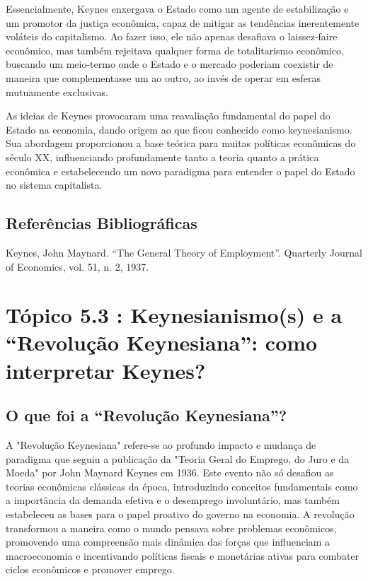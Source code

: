\documentclass[a4paper,12pt]{article}[abntex2]
\begin{document}
Essencialmente, Keynes enxergava o Estado como um agente de estabilização e um promotor da justiça econômica, capaz de mitigar as tendências inerentemente voláteis do capitalismo. Ao fazer isso, ele não apenas desafiava o laissez-faire econômico, mas também rejeitava qualquer forma de totalitarismo econômico, buscando um meio-termo onde o Estado e o mercado poderiam coexistir de maneira que complementasse um ao outro, ao invés de operar em esferas mutuamente exclusivas.

As ideias de Keynes provocaram uma reavaliação fundamental do papel do Estado na economia, dando origem ao que ficou conhecido como keynesianismo. Sua abordagem proporcionou a base teórica para muitas políticas econômicas do século XX, influenciando profundamente tanto a teoria quanto a prática econômica e estabelecendo um novo paradigma para entender o papel do Estado no sistema capitalista.

\subsection{\textbf{Referências Bibliográficas}}
Keynes, John Maynard. “The General Theory of Employment”. Quarterly Journal of Economics,
vol. 51, n. 2, 1937.

\section{\textbf{Tópico 5.3 : Keynesianismo(s) e a “Revolução Keynesiana”: como interpretar Keynes?}}
\subsection{\textbf{O que foi a “Revolução Keynesiana”?}}
A "Revolução Keynesiana" refere-se ao profundo impacto e mudança de paradigma que seguiu a publicação da "Teoria Geral do Emprego, do Juro e da Moeda" por John Maynard Keynes em 1936. Este evento não só desafiou as teorias econômicas clássicas da época, introduzindo conceitos fundamentais como a importância da demanda efetiva e o desemprego involuntário, mas também estabeleceu as bases para o papel proativo do governo na economia. A revolução transformou a maneira como o mundo pensava sobre problemas econômicos, promovendo uma compreensão mais dinâmica das forças que influenciam a macroeconomia e incentivando políticas fiscais e monetárias ativas para combater ciclos econômicos e promover emprego.
\end{document}
